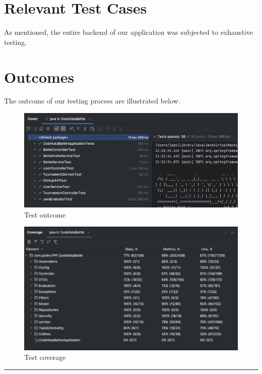 \documentclass{Configuration_Files/Template}
\begin{document}
\section{Relevant Test Cases}

As mentioned, the entire backend of our application was subjected to exhaustive testing.

\section{Outcomes}

The outcome of our testing process are illustrated below.\\

\begin{figure}[h]
    \centering
    \includegraphics[scale = 0.4]{ITD_latex/Images/Test/Test1.jpg}
    \caption{Test outcome}
\end{figure}

\begin{figure}[h]
    \centering
    \includegraphics[scale = 0.4]{ITD_latex/Images/Test/Test2.jpg}
    \caption{Test coverage}
\end{figure}

{\color{bluepoli}\rule{\linewidth}{0.1pt}}
\end{document}
